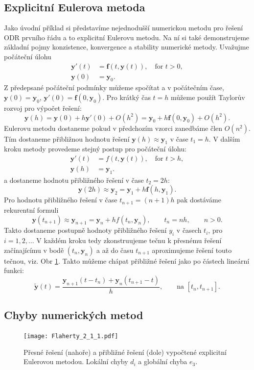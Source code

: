 \documentclass[a4paper, 12pt]{book}
\theoremstyle{definition}
\def\vc#1{\mathbf{\boldsymbol{#1}}}     %
\begin{document}
\subsection{Explicitní Eulerova metoda}
Jako úvodní příklad si představíme nejednodušší numerickou metodu pro řešení ODR prvního řádu a
to explicitní Eulerovu metodu. Na ní si také demonstrujeme základní pojmy konzistence, konvergence a stability numerické metody.
Uvažujme počáteční úlohu
\begin{align*}    
   \vc y'(t) &= \vc f(t,\vc y(t)), \quad \text{for }t>0,\\
   \vc y(0)&=\vc y_0.
\end{align*}
Z předepsané počáteční podmínky můžeme spočítat  a  v počátečním čase, $\vc y(0) = \vc y_0$, $\vc y'(0) = \vc f(0, \vc y_0)$. 
Pro krátký čas $t=h$ můžeme použít Taylorův rozvoj pro výpočet řešení:
\[
  \vc y(h) = \vc y(0) + h \vc y'(0) + O(h^2) = \vc y_0 + h \vc f(0, \vc y_0) + O(h^2).
\]
Eulerovu metodu dostaneme pokud v předchozím vzorci zanedbáme člen $O(n^2)$. Tím dostaneme přibližnou hodnotu řešení $\vc y(h) \approx \vc y_1$
v čase $t_1=h$. V dalším kroku metody provedeme stejný postup pro počáteční úlohu:
\begin{align*}
   \vc y'(t) &= f(t, \vc y(t)), \quad \text{for }t>h,\\
   \vc y(h)&=\vc y_1.
\end{align*}
a dostaneme hodnotu přibližného řešení v čase $t_2=2h$:
\[
   \vc y(2h) \approx \vc y_2 = \vc y_1 + h \vc f(h, \vc y_1).
\]
Pro hodnotu přibližného řešení v čase $t_{n+1}=(n+1)h$ pak dostáváme rekurentní formuli
\begin{equation}
   \label{eq:Euler_method}
   \vc y(t_{n+1}) \approx \vc y_{n+1} = \vc y_n + h f(t_n, \vc y_n),\qquad t_n=nh,\qquad n>0.
\end{equation}
Takto dostaneme postupně hodnoty přibližného řešení $y_i$ v časech $t_i$, pro $i=1,2,\dots$
V každém kroku tedy zkonstruujeme tečnu k přesnému řešení začínajícímu v bodě $(t_n, \vc y_n)$
a až do času $t_{n+1}$ aproximujeme řešení touto tečnou, viz. Obr \ref{fig:Euler_approx}.
Takto můžeme chápat přibližné řešení jako po částech lineární funkci:
\[
   \vc{\tilde y}(t) = \frac{\vc y_{n+1}(t - t_n) + \vc y_n(t_{n+1}-t)}{h},\qquad \text{na } [t_n, t_{n+1}].
\]
\pagebreak

\subsection{Chyby numerických metod}
\begin{figure}[h]
 \centering
 \texttt{[image: Flaherty\_2\_1\_1.pdf]}
 \caption{Přesné řešení (nahoře) a přibližné řešení (dole) vypočtené explicitní Eulerovou metodou. Lokální chyby $d_i$ a globální chyba $e_3$.}
 \label{fig:Euler_approx}
\end{figure}
\end{document}
